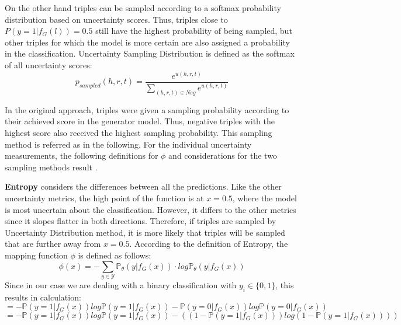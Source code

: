 \begin{itemize}
    On the other hand triples can be sampled according to a softmax probability distribution based on uncertainty scores.
    Thus, triples close to $P(y = 1 | f_G(l)) = 0.5$ still have the highest probability of being sampled, but other triples for which the model is more certain are also assigned a probability in the classification.
    Uncertainty Sampling Distribution is defined as the softmax of all uncertainty scores:
    \begin{equation}
        \label{eq:uncertainty_distribution}
        p_{sampled}(h,r,t) = \frac{e^{u(h,r,t)}}{\sum_{(h,r,t) \in Neg}{e^{u(h,r,t)}}}
    \end{equation}
\end{itemize}
In the original \kbgan approach, triples were given a sampling probability according to their achieved score in the generator model.
Thus, negative triples with the highest score also received the highest sampling probability.
This sampling method is referred as \origsampling in the following.
For the individual uncertainty measurements, the following definitions for $\phi$ and considerations for the two sampling methods result \cite{human-in-the-loop}.

\textbf{Entropy} 
considers the differences between all the predictions.
Like the other uncertainty metrics, the high point of the function is at $x = 0.5$, where the model is most uncertain about the classification.
However, it differs to the other metrics since it slopes flatter in both directions.
Therefore, if triples are sampled by Uncertainty Distribution method, it is more likely that triples will be sampled that are further away from $x=0.5$.
According to the definition of Entropy, the mapping function $\phi$ is defined as follows:
\begin{equation}
    \phi(x) = - \sum_{y \in \mathcal{Y}}{\mathds{P}_{\theta}(y | f_G(x)) \cdot log \mathds{P}_{\theta}(y | f_G(x))}
\end{equation}
Since in our case we are dealing with a binary classification with $y_i \in \{0,1\}$, this results in calculation:
\begin{equation}
= - \mathds{P}(y = 1| f_G(x)) log \mathds{P}(y = 1 | f_G(x))
- \mathds{P}(y = 0| f_G(x)) log \mathds{P}(y = 0 | f_G(x))
\end{equation}
\begin{equation}
= - \mathds{P}(y = 1| f_G(x) ) log \mathds{P}(y = 1 | f_G(x))
- ((1 - \mathds{P}(y = 1 | f_G(x)))
     log(1 - \mathds{P}(y = 1 | f_G(x))))
\end{equation}

